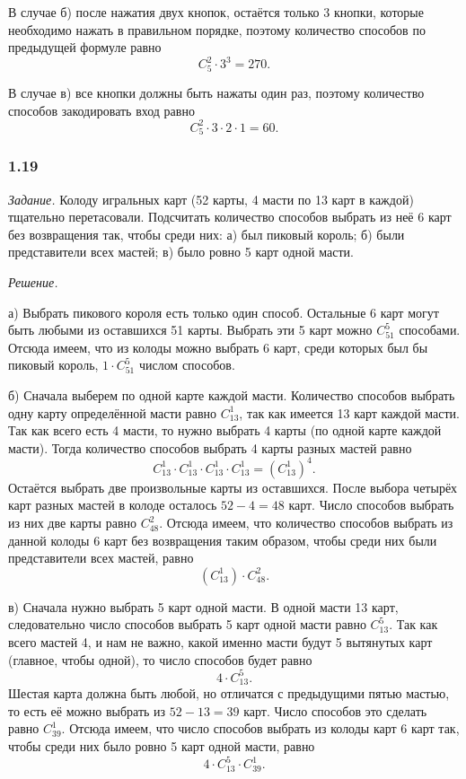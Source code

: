 \documentclass{book}
\begin{document}
В случае б) после нажатия двух кнопок, остаётся только 3 кнопки, которые необходимо нажать в правильном порядке, поэтому количество способов по предыдущей формуле равно $$C_5^2\cdot 3^3=270.$$

В случае в) все кнопки должны быть нажаты один раз, поэтому количество способов закодировать вход равно $$C_5^2\cdot 3\cdot 2\cdot 1=60.$$

\subsubsection*{1.19}

\textit{Задание.} Колоду игральных карт (52 карты, 4 масти по 13 карт в каждой) тщательно перетасовали. Подсчитать количество способов выбрать из неё 6 карт без возвращения так, чтобы среди них: а) был пиковый король; б) были представители всех мастей; в) было ровно 5 карт одной масти.

\textit{Решение.}

а) Выбрать пикового короля есть только один способ. Остальные 6 карт могут быть любыми из оставшихся 51 карты. Выбрать эти 5 карт можно $C_{51}^5$ способами. Отсюда имеем, что из колоды можно выбрать 6 карт, среди которых был бы пиковый король, $1\cdot C_{51}^5$ числом способов.

б) Сначала выберем по одной карте каждой масти. Количество способов выбрать одну карту определённой масти равно $C_{13}^1$, так как имеется 13 карт каждой масти. Так как всего есть 4 масти, то нужно выбрать 4 карты (по одной карте каждой масти). Тогда количество способов выбрать 4 карты разных мастей равно $$C_{13}^1\cdot C_{13}^1\cdot C_{13}^1\cdot C_{13}^1=\left(C_{13}^1\right)^4.$$ Остаётся выбрать две произвольные карты из оставшихся. После выбора четырёх карт разных мастей в колоде осталось $52-4=48$ карт. Число способов выбрать из них две карты равно $C_{48}^2$. Отсюда имеем, что количество способов выбрать из данной колоды 6 карт без возвращения таким образом, чтобы среди них были представители всех мастей, равно $$\left(C_{13}^1\right)\cdot C_{48}^2.$$

в) Сначала нужно выбрать 5 карт одной масти. В одной масти 13 карт, следовательно число способов выбрать 5 карт одной масти равно $C_{13}^5$. Так как всего мастей 4, и нам не важно, какой именно масти будут 5 вытянутых карт (главное, чтобы одной), то число способов будет равно $$4\cdot C_{13}^5.$$ Шестая карта должна быть любой, но отличатся с предыдущими пятью мастью, то есть её можно выбрать из $52-13=39$ карт. Число способов это сделать равно $C_{39}^1$. Отсюда имеем, что число способов выбрать из колоды карт 6 карт так, чтобы среди них было ровно 5 карт одной масти, равно $$4\cdot C_{13}^5\cdot C_{39}^1.$$
\end{document}
